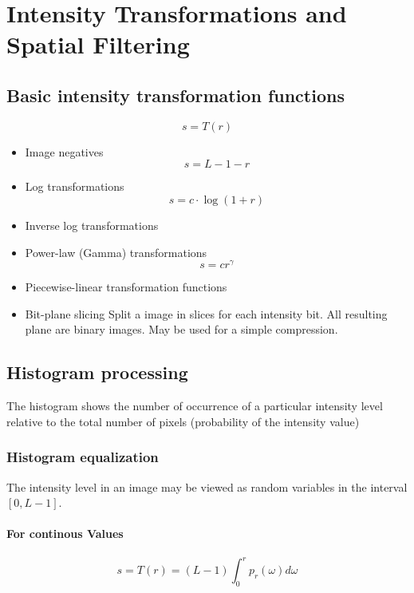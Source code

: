 \section{Intensity Transformations and Spatial Filtering }

\subsection{Basic intensity transformation functions}
\begin{equation}
s = T(r)
\end{equation}

\begin{itemize}
	\item Image negatives
		\begin{equation}
			s = L-1-r
		\end{equation}
	\item Log transformations
		\begin{equation}
			s = c \cdot \log{(1 + r)}
		\end{equation}
	\item Inverse log transformations
	\item Power-law (Gamma) transformations
		\begin{equation}
			s = c r^\gamma
		\end{equation}
	\item Piecewise-linear transformation functions
	\item Bit-plane slicing
		Split a image in slices for each intensity bit.  All resulting plane are binary images.
		May be used for a simple compression.
	
\end{itemize}


\subsection{Histogram processing}
The histogram shows the number of occurrence of a particular intensity level relative to the total number of pixels (probability of the intensity value)

\subsubsection{Histogram equalization}
The intensity level in an image may be viewed as random variables in the interval $[0, L-1]$.

\paragraph{For continous Values}
\begin{equation}
	s = T(r) = (L-1)\int_0^r p_r(\omega) d\omega
\end{equation} 

